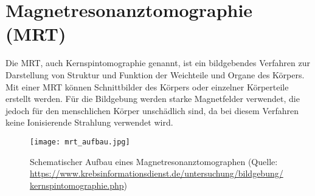 \section{Magnetresonanztomographie (MRT)}
Die \ac{MRT}, auch Kernspintomographie genannt, ist ein bildgebendes Verfahren zur Darstellung von Struktur und Funktion der Weichteile und Organe des Körpers. Mit einer \ac{MRT} können Schnittbilder des Körpers oder einzelner Körperteile erstellt werden. Für die Bildgebung werden starke Magnetfelder verwendet, die jedoch für den menschlichen Körper unschädlich sind, da bei diesem Verfahren keine \gls{Ionisierende Strahlung} verwendet wird. \cite[vgl.][]{Kramme2016}\\
\begin{figure}[ht]
	\centering
	\texttt{[image: mrt\_aufbau.jpg]}
	\caption{Schematischer Aufbau eines Magnetresonanztomographen (Quelle: \url{https://www.krebsinformationsdienst.de/untersuchung/bildgebung/kernspintomographie.php})}
\end{figure}

